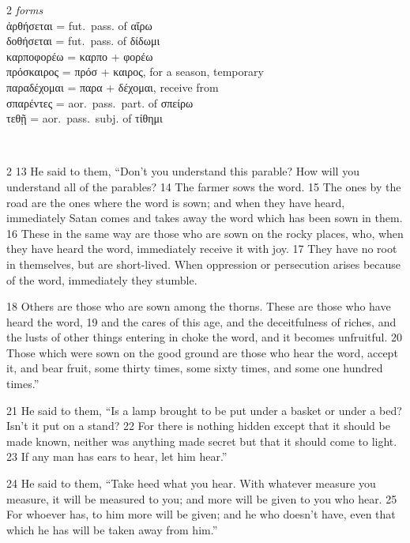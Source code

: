 \documentclass[10pt,a5paper,twoside,twocolumn]{book}
\newcommand*\cleartoleftpage{%
  \ifodd\value{page}\hbox{}\clearpage\fi
}
\newcommand{\separator}{
  \vspace{-0.5\baselineskip}%
  \hspace{0.27\textwidth}%
  \noindent\makebox[\linewidth]{\resizebox{0.3333\linewidth}{1pt}{$\bullet$}}\bigskip%
  \vspace{-0.5\baselineskip}
}
\newenvironment{facing}{\cleartoleftpage}{\clearpage\pagebreak}
\newenvironment{help}{\clearpage}{}
\newenvironment{helpsec}{\begin{minipage}[t]{\textwidth}\begin{multicols}{2}}{\end{multicols}\end{minipage}}
\newenvironment{vocab}{\begin{helpsec}}{\end{helpsec}}
\newenvironment{translation}{\separator\\\begin{helpsec}\footnotesize}{\end{helpsec}}
\begin{document}
\begin{facing}
\begin{help}
\begin{vocab}
\emph{forms}\\
ἀρθήσεται = fut.~pass. of αἴρω\\
δοθήσεται = fut.~pass. of δίδωμι\\
καρποφορέω = καρπο + φορέω\\
πρόσκαιρος = πρόσ + καιρος, for a season, temporary\\
παραδέχομαι = παρα + δέχομαι, receive from\\
σπαρέντες = aor.~pass.~part. of σπείρω\\
τεθῇ = aor.~pass.~subj. of τίθημι\\
\end{vocab}
\begin{translation}
 13 He said to them, ``Don't you understand this parable? How will you understand all of the parables? 14  The farmer sows the word. 15  The ones by the road are the ones where the word is sown; and when they have heard, immediately Satan comes and takes away the word which has been sown in them. 16  These in the same way are those who are sown on the rocky places, who, when they have heard the word, immediately receive it with joy. 17  They have no root in themselves, but are short-lived. When oppression or persecution arises because of the word, immediately they stumble. 

18  Others are those who are sown among the thorns. These are those who have heard the word, 19  and the cares of this age, and the deceitfulness of riches, and the lusts of other things entering in choke the word, and it becomes unfruitful. 20  Those which were sown on the good ground are those who hear the word, accept it, and bear fruit, some thirty times, some sixty times, and some one hundred times.''

21 He said to them, ``Is a lamp brought to be put under a basket  or under a bed? Isn't it put on a stand? 22  For there is nothing hidden except that it should be made known, neither was anything made secret but that it should come to light. 23  If any man has ears to hear, let him hear.''

24 He said to them, ``Take heed what you hear. With whatever measure you measure, it will be measured to you; and more will be given to you who hear. 25  For whoever has, to him more will be given; and he who doesn't have, even that which he has will be taken away from him.''
\end{translation}
\end{help}
\end{facing}
\end{document}
